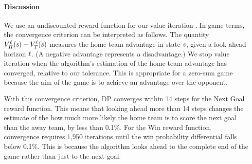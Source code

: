 \paragraph{Discussion} We use an undiscounted reward function for our value iteration \citep{Schwartz1993}. 
In game terms, the convergence criterion can be interpreted as follows. The quantity $V_{H}^{\ell}(s) - V_T^{\ell}(s)$ measures the home team advantage in state $s$, given a look-ahead horizon $\ell$. (A negative advantage represents a disadvantage.) We stop value iteration when the algorithm's estimation of the home team advantage has converged, relative to our tolerance. This is appropriate for a zero-sum game because the aim of the game is to achieve an advantage over the opponent.


 With this convergence criterion, DP converges within 14 steps for the Next Goal reward function. This means that looking ahead more than 14 steps changes the estimate of the how much more likely the home team is to score the next goal than the away team,  by less than 0.1\%. For the Win reward function, convergence requires 1,950 iterations until the win probability differential falls below 0.1\%. This is because the algorithm looks ahead to the complete end of the game rather than just to the next goal.
%




%

